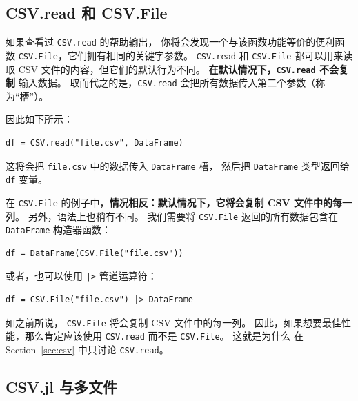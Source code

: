 \documentclass[
  notoc %
]{tufte-book}
\newcommand{\passthrough}[1]{#1}
\begin{document}
\hypertarget{sec:df_performance_csv_read_file}{%
\subsection{CSV.read 和
CSV.File}\label{sec:df_performance_csv_read_file}}

如果查看过 \passthrough{\lstinline!CSV.read!} 的帮助输出，
你将会发现一个与该函数功能等价的便利函数
\passthrough{\lstinline!CSV.File!}，它们拥有相同的关键字参数。
\passthrough{\lstinline!CSV.read!} 和 \passthrough{\lstinline!CSV.File!}
都可以用来读取 CSV 文件的内容，但它们的默认行为不同。
\textbf{在默认情况下，\passthrough{\lstinline!CSV.read!} 不会复制}
输入数据。 取而代之的是，\passthrough{\lstinline!CSV.read!}
会把所有数据传入第二个参数（称为``槽''）。

因此如下所示：

\begin{lstlisting}
df = CSV.read("file.csv", DataFrame)
\end{lstlisting}

这将会把 \passthrough{\lstinline!file.csv!} 中的数据传入
\passthrough{\lstinline!DataFrame!} 槽， 然后把
\passthrough{\lstinline!DataFrame!} 类型返回给
\passthrough{\lstinline!df!} 变量。

在 \passthrough{\lstinline!CSV.File!}
的例子中，\textbf{情况相反：默认情况下，它将会复制 CSV 文件中的每一列}。
另外，语法上也稍有不同。 我们需要将 \passthrough{\lstinline!CSV.File!}
返回的所有数据包含在 \passthrough{\lstinline!DataFrame!} 构造器函数：

\begin{lstlisting}
df = DataFrame(CSV.File("file.csv"))
\end{lstlisting}

或者，也可以使用 \passthrough{\lstinline!|>!} 管道运算符：

\begin{lstlisting}
df = CSV.File("file.csv") |> DataFrame
\end{lstlisting}

如之前所说， \passthrough{\lstinline!CSV.File!} 将会复制 CSV
文件中的每一列。 因此，如果想要最佳性能，那么肯定应该使用
\passthrough{\lstinline!CSV.read!} 而不是
\passthrough{\lstinline!CSV.File!}。 这就是为什么 在
Section~\ref{sec:csv} 中只讨论 \passthrough{\lstinline!CSV.read!}。

\hypertarget{sec:df_performance_csv_multiple}{%
\subsection{CSV.jl 与多文件}\label{sec:df_performance_csv_multiple}}
\end{document}

